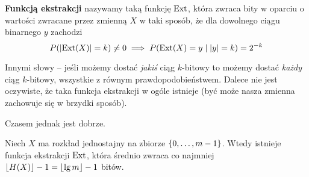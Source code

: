 \begin{definition}
	\textbf{Funkcją ekstrakcji} nazywamy taką funkcję \( \operatorname{Ext} \), która zwraca bity w oparciu o wartości zwracane przez zmienną \( X \) w taki sposób, że dla dowolnego ciągu binarnego \( y \) zachodzi
	\[
		P(\left\lvert\operatorname{Ext}(X)\right\rvert = k) \neq 0 \implies P(\operatorname{Ext}(X) = y \mid \left\lvert y\right\rvert = k) = 2^{-k}
	\]
\end{definition}
Innymi słowy -- jeśli możemy dostać \textit{jakiś} ciąg \( k \)-bitowy to możemy dostać \textit{każdy} ciąg \(k\)-bitowy, wszystkie z równym prawdopodobieństwem.
Dalece nie jest oczywiste, że taka funkcja ekstrakcji w ogóle istnieje (być może nasza zmienna zachowuje się w brzydki sposób).

Czasem jednak jest dobrze.
\begin{theorem}[Twierdzenie 10.4 P\&C]
	Niech \( X \) ma rozkład jednostajny na zbiorze \( \set{0, \dots, m - 1} \).
	Wtedy istnieje funkcja ekstrakcji \( \operatorname{Ext} \), która średnio zwraca co najmniej
	\( \left\lfloor H(X)\right\rfloor - 1  = \left\lfloor\lg m\right\rfloor - 1\) bitów.
\end{theorem}
